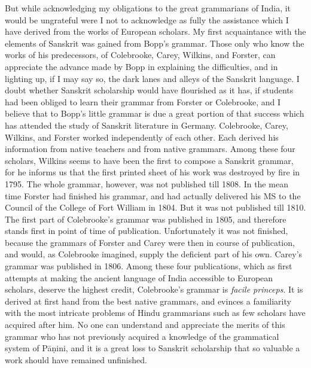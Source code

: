 But while acknowledging my obligations to the great grammarians of
India, it would be ungrateful were I not to acknowledge as fully the
assistance which I have derived from the works of European scholars. My
first acquaintance with the elements of Sanskrit was gained from Bopp's
grammar. Those only who know the works of his predecessors, of
Colebrooke, Carey, Wilkins, and Forster, can appreciate the advance made
by Bopp in explaining the difficulties, and in lighting up, if I may say
so, the dark lanes and alleys of the Sanskrit language. I doubt whether
Sanskrit scholarship would have flourished as it has, if students had
been obliged to learn their grammar from Forster or Colebrooke, and I
believe that to Bopp's little grammar is due a great portion of that
success which has attended the study of Sanskrit literature in Germany.
Colebrooke, Carey, Wilkins, and Forster worked independently of each
other. Each derived his information from native teachers and from native
grammars. Among these four scholars, Wilkins seems to have been the
first to compose a Sanskrit grammar, for he informs us that the first
printed sheet of his work was destroyed by fire in 1795. The whole
grammar, however, was not published till 1808. In the mean time Forster
had finished his grammar, and had actually delivered his MS to the
Council of the College of Fort William in 1804. But it was not published
till 1810. The first part of Colebrooke's grammar was published in 1805,
and therefore stands first in point of time of publication.
Unfortunately it was not finished, because the grammars of Forster and
Carey were then in course of publication, and would, as Colebrooke
imagined, supply the deficient part of his own. Carey's grammar was
published in 1806. Among these four publications, which as first
attempts at making the ancient language of India accessible to European
scholars, deserve the highest credit, Colebrooke's grammar is
\emph{facile princeps}. It is derived at first hand from the best native
grammars, and evinces a familiarity with the most intricate problems of
Hindu grammarians such as few scholars have acquired after him. No one
can understand and appreciate the merits of this grammar who has not
previously acquired a knowledge of the grammatical system of Pāṇini, and
it is a great loss to Sanskrit scholarship that so valuable a work
should have remained unfinished.

